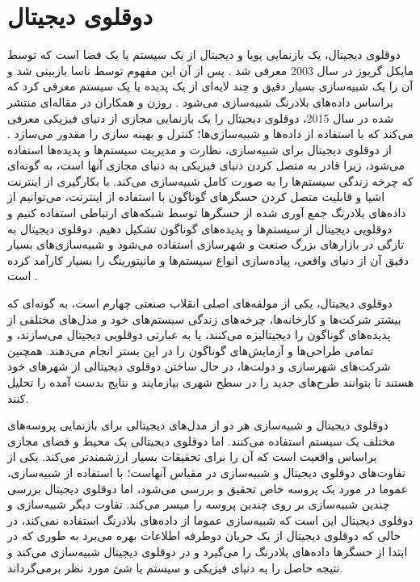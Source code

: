 \section{دوقلوی دیجیتال}
دوقلوی دیجیتال، یک بازنمایی پویا و دیجیتال از یک سیستم یا یک فضا است که توسط مایکل گریوز در سال 2003 معرفی شد \cite{grieves2014digital}. پس از آن این مفهوم توسط ناسا بازبینی شد و آن را یک شبیه‌سازی بسیار دقیق و چند لایه‌ای از یک پدیده یا یک سیستم معرفی کرد که براساس داده‌های بلادرنگ شبیه‌سازی می‌شود \cite{glaessgen2012digital}. روزن و همکاران در مقاله‌ای منتشر شده در سال 2015، دوقلوی دیجیتال را یک بازنمایی مجازی از دنیای فیزیکی معرفی می‌کند که با استفاده از داده‌ها و شبیه‌سازی‌ها؛ کنترل‌ و بهینه سازی را مقدور می‌سازد \cite{rosen2015importance}. از دوقلوی دیجیتال برای شبیه‌سازی، نظارت و مدیریت سیستم‌ها و پدیده‌ها استفاده می‌شود، زیرا قادر به متصل کردن دنیای فیزیکی به دنیای مجازی آنها است، به گونه‌ای که چرخه زندگی سیستم‌ها را به صورت کامل شبیه‌سازی می‌کند. با بکارگیری از اینترنت اشیا و قابلیت متصل کردن حسگرهای گوناگون با استفاده از اینترنت، می‌توانیم از داده‌های بلادرنگ جمع ‌آوری شده از حسگر‌ها توسط شبکه‌های ارتباطی استفاده کنیم و دوقلویی دیجیتال از سیستم‌ها و پدیده‌های گوناگون تشکیل دهیم. دوقلوی دیجیتال به تازگی در بازارهای بزرگ صنعت و شهرسازی استفاده می‌شود و شبیه‌سازی‌های بسیار دقیق آن از دنیای واقعی، پیاده‌سازی انواع سیستم‌ها و مانیتورینگ را بسیار کارآمد کرده است \cite{farsi2020digital}.

دوقلوی دیجیتال، یکی از مولفه‌های اصلی انقلاب صنعتی چهارم است، به گونه‌ای که بیشتر شرکت‌ها و کارخانه‌ها، چرخه‌های زندگی سیستم‌های خود و مدل‌های مختلفی از پدیده‌های گوناگون را دیجیتالیزه می‌کنند، یا به عبارتی دوقلویی دیجیتال می‌سازند، و تمامی طراحی‌ها و آزمایش‌های گوناگون را در این بستر انجام می‌دهند. همچنین شرکت‌های شهرسازی و دولت‌ها، در حال ساختن دوقلوی دیجیتالی از شهر‌های خود هستند تا بتوانند طرح‌های جدید را در سطح شهری بیازمایند و نتایج بدست آمده را تحلیل کنند.  

دوقلوی دیجیتال و شبیه‌سازی هر دو از مدل‌های دیجیتالی برای بازنمایی پروسه‌های مختلف یک سیستم استفاده می‌کنند. اما دوقلوی دیجیتالی یک محیط و فضای مجازی براساس واقعیت است که آن را برای تحقیقات بسیار ارزشمندتر می‌کند. یکی از تفاوت‌های دوقلوی دیجیتال و شبیه‌سازی در مقیاس آنهاست؛ با استفاده از شبیه‌سازی، عموما در مورد یک پروسه خاص تحقیق و بررسی می‌شود، اما دوقلوی دیجیتال بررسی چندین شبیه‌سازی بر روی چندین پروسه را میسر می‌کند. تفاوت دیگر شبیه‌سازی و دوقلوی دیجیتال این است که شبیه‌سازی عموما از داده‌های بلادرنگ استفاده نمی‌کند،  در حالی که دوقلوی دیجیتال از یک جریان دوطرفه اطلاعات بهره می‌برد به طوری که در ابتدا از حسگر‌ها داده‌های بلادرنگ را می‌گیرد و در دوقلوی دیجیتال شبیه‌سازی می‌کند و نتیجه حاصل را به دنیای فیزیکی و سیستم یا شئ مورد نظر بر‌می‌گرداند.

